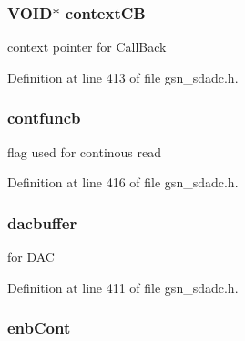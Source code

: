 \hypertarget{a00215_a2898b010839acbc30fb49ec89189292c}{
\subsubsection[{contextCB}]{\setlength{\rightskip}{0pt plus 5cm}VOID$\ast$ {\bf contextCB}}}
\label{a00215_a2898b010839acbc30fb49ec89189292c}
context pointer for CallBack 

Definition at line 413 of file gsn\_\-sdadc.h.

\hypertarget{a00215_abffed4adaed28f91e95ec588b6885c63}{
\subsubsection[{contfuncb}]{ {\bf contfuncb}}}
\label{a00215_abffed4adaed28f91e95ec588b6885c63}
flag used for continous read 

Definition at line 416 of file gsn\_\-sdadc.h.

\hypertarget{a00215_a2bc87ca9c44259b62873d1cf2061069e}{
\subsubsection[{dacbuffer}]{ {\bf dacbuffer}}}
\label{a00215_a2bc87ca9c44259b62873d1cf2061069e}
for DAC 

Definition at line 411 of file gsn\_\-sdadc.h.

\hypertarget{a00215_a359a1fb11fb5fc562d00321619df6340}{
\subsubsection[{enbCont}]{ {\bf enbCont}}}
\label{a00215_a359a1fb11fb5fc562d00321619df6340}


